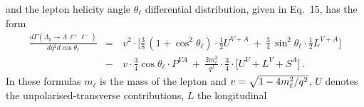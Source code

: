 and the lepton helicity angle $\theta_\ell$ differential distribution, given in Eq.~15, has the form
\begin{eqnarray}
\label{costheta2}
\frac{d\Gamma(\Lambda_{b}\to \Lambda \,\ell^{+}\ell^{-})}{dq^2d\cos\theta_\ell} 
&=&\,
v^{2}\cdot\bigg[\frac{3}{8}\,(1+\cos^2\theta_\ell)\cdot
\frac{1}{2} U^{V+A}  
\ + \ \frac{3}{4}\,\sin^2\theta_\ell\cdot
\frac{1}{2} L^{V+A} \bigg]\label{distr2}\nonumber\\[2mm]
&-&\,v \cdot\frac{3}{4}\cos\theta_\ell\cdot P^{VA} 
\ + \ \frac{2m_{\ell}^{2}}{q^{2}}\cdot \frac{3}{4}\cdot
\bigg[ U^{V}+ L^{V} + S^{A} \bigg]\,.
\end{eqnarray}
%
In these formulas $m_\ell$ is the mass of the lepton and $v = \sqrt{1-4m_\ell^2/q^2}$, $U$ denotes
the unpolarised-transverse contributions, $L$ the longitudinal
